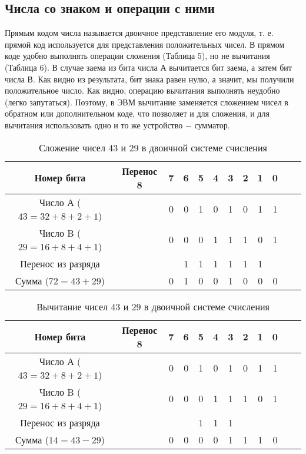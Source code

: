 \documentclass[a4paper]{article}
\begin{document}
\subsection{Числа со знаком и операции с ними}
Прямым кодом числа называется двоичное представление его модуля, т. е. прямой код используется для представления положительных чисел. В прямом коде удобно выполнять операции сложения (Таблица 5), но не вычитания (Таблица 6). В случае заема из бита числа А вычитается бит заема, а затем бит числа В. Как видно из результата, бит знака равен нулю, а значит, мы получили положительное число. Как видно, операцию вычитания выполнять неудобно (легко запутаться). Поэтому, в ЭВМ вычитание заменяется сложением чисел в обратном или дополнительном коде, что позволяет и для сложения, и для вычитания использовать одно и то же устройство $-$ сумматор.
\begin{table}\label{table:add}
      \caption{Сложение чисел 43 и 29 в двоичной системе счисления}
      \begin{center}
      \begin{tabular}{c * {11}{c}}
        \toprule
        Номер бита & Перенос 8 & 7 & 6 & 5 & 4 & 3 & 2 & 1 & 0 \\
        \toprule
        Число А ($43 = 32 + 8 + 2 + 1$) &  & 0 & 0 & 1 & 0 & 1 & 0 & 1 & 1\\
        \midrule
        Число B ($29 = 16 + 8 + 4 + 1$) &  & 0 & 0 & 0 & 1 & 1 & 1 & 0 & 1\\
        \midrule
        Перенос из разряда &  &  & 1 & 1 & 1 & 1 & 1 & 1 & \\
        \midrule
        Сумма ($72 = 43 + 29$) &  & 0 & 1 & 0 & 0 & 1 & 0 & 0 & 0 \\
        \bottomrule
      \end{tabular}
    \end{center}
\end{table}


\begin{table}\label{table:sub}
      \caption{Вычитание  чисел 43 и 29 в двоичной системе счисления}
      \begin{center}
      \begin{tabular}{c * {11} {c}}
        \toprule
        Номер бита & Перенос 8 & 7 & 6 & 5 & 4 & 3 & 2 & 1 & 0 \\
        \toprule
        Число А ($43 = 32 + 8 + 2 + 1$) &  & 0 & 0 & 1 & 0 & 1 & 0 & 1 & 1\\
        \midrule
        Число B ($29 = 16 + 8 + 4 + 1$) &  & 0 & 0 & 0 & 1 & 1 & 1 & 0 & 1\\
        \midrule
        Перенос из разряда &  &  &  & 1 & 1 & 1 &  &  & \\
        \midrule
        Сумма ($14 = 43 - 29$) &  & 0 & 0 & 0 & 0 & 1 & 1 & 1 & 0 \\
        \midrule
      \end{tabular}
      \end{center}
    \end{table}
\end{document}
